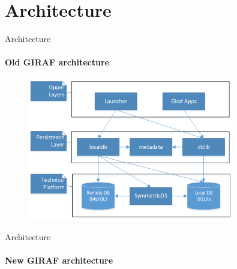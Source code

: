 \section{Architecture}
    \begin{frame}[t]{Architecture}\framesubtitle{Old GIRAF architecture}
        \begin{figure}
        	\includegraphics[width=0.8\textwidth]{images/old_architecture.png}
        \end{figure}
    \end{frame}

    \begin{frame}[t]{Architecture}\framesubtitle{New GIRAF architecture}
    	\begin{figure}
    		\scalebox{0.6}{%
        	}
        \end{figure}
    \end{frame}
